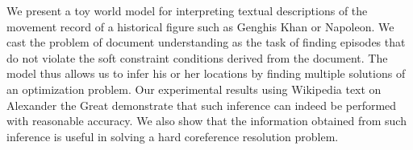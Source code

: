 We present a toy world model for interpreting textual descriptions of the movement record of a historical figure such as Genghis Khan or Napoleon. We cast the problem of document understanding as the task of finding episodes that do not violate the soft constraint conditions derived from the document. The model thus allows us to infer his or her locations by finding multiple solutions of an optimization problem. Our experimental results using Wikipedia text on Alexander the Great demonstrate that such inference can indeed be performed with reasonable accuracy. We also show that the information obtained from such inference is useful in solving a hard coreference resolution problem.
